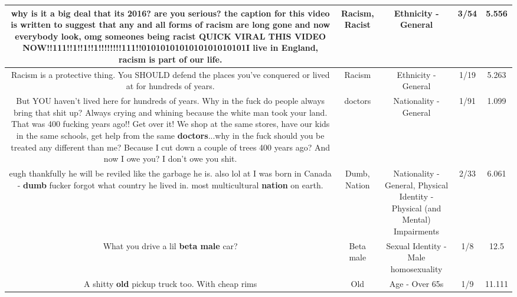 \documentclass[11pt]{article}
\newlength\mylength
\begin{document}
\begin{center}
\begin{longtable}{|C{.65\mylength}|C{.30\mylength}|C{.12\mylength}|C{.12\mylength}|C{.12\mylength}|}
  \small why is it a big deal that its 2016? are you serious? the caption for this video is written to suggest that any and all forms of \textbf{racism} are long gone and now everybody look, omg someones being \textbf{racist} QUICK VIRAL THIS VIDEO NOW!!111!!1!!1!!1!!!!!!!!111!!0101010101010101010101I live in England, \textbf{racism} is part of our life.\normalsize   & Racism, Racist & Ethnicity - General & 3/54 & 5.556 \\  \hline
  \small Racism is a protective thing. You SHOULD defend the places you've conquered or lived at for hundreds of years.\normalsize   & Racism & Ethnicity - General & 1/19 & 5.263 \\  \hline
  \small But YOU haven't lived here for hundreds of years. Why in the fuck do people always bring that shit up? Always crying and whining because the white man took your land. That was 400 fucking years ago!! Get over it! We shop at the same stores, have our kids in the same schools, get help from the same \textbf{doctors}...why in the fuck should you be treated any different than me? Because I cut down a couple of trees 400 years ago? And now I owe you? I don't owe you shit.\normalsize   & doctors & Nationality - General & 1/91 & 1.099 \\  \hline
  \small eugh thankfully he will be reviled like the garbage he is. also lol at I was born in Canada - \textbf{dumb} fucker forgot what country he lived in. most multicultural \textbf{nation} on earth.\normalsize   & Dumb, Nation & Nationality - General, Physical Identity - Physical (and Mental) Impairments & 2/33 & 6.061 \\  \hline
  \small What you drive a lil \textbf{beta male} car?\normalsize   & Beta male & Sexual Identity - Male homosexuality & 1/8 & 12.5 \\  \hline
  \small A shitty \textbf{old} pickup truck too. With cheap rims\normalsize   & Old & Age - Over 65s & 1/9 & 11.111 \\  \hline

\end{longtable}
\end{center}
\end{document}

